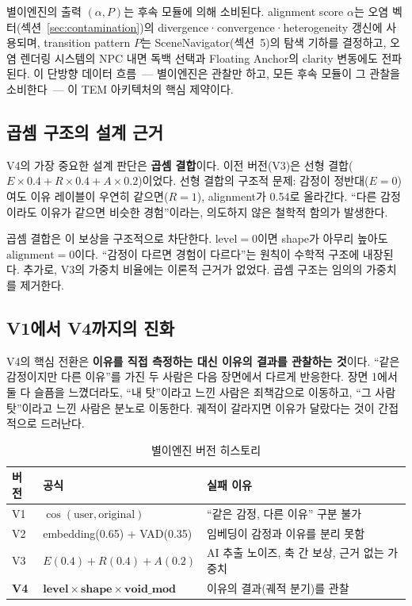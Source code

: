 \documentclass[11pt, a4paper]{article}
\begin{document}
별이엔진의 출력 $(\alpha, P)$는 후속 모듈에 의해 소비된다. alignment score $\alpha$는 오염 벡터(섹션~\ref{sec:contamination})의 divergence·convergence·heterogeneity 갱신에 사용되며, transition pattern $P$는 SceneNavigator(섹션~5)의 탐색 기하를 결정하고, 오염 렌더링 시스템의 NPC 내면 독백 선택과 Floating Anchor의 clarity 변동에도 전파된다. 이 단방향 데이터 흐름~--- 별이엔진은 관찰만 하고, 모든 후속 모듈이 그 관찰을 소비한다~--- 이 TEM 아키텍처의 핵심 제약이다.

\subsection{곱셈 구조의 설계 근거}

V4의 가장 중요한 설계 판단은 \textbf{곱셈 결합}이다. 이전 버전(V3)은 선형 결합($E \times 0.4 + R \times 0.4 + A \times 0.2$)이었다. 선형 결합의 구조적 문제: 감정이 정반대($E=0$)여도 이유 레이블이 우연히 같으면($R=1$), alignment가 0.54로 올라간다. ``다른 감정이라도 이유가 같으면 비슷한 경험''이라는, 의도하지 않은 철학적 함의가 발생한다.

곱셈 결합은 이 보상을 구조적으로 차단한다. $\text{level} = 0$이면 shape가 아무리 높아도 $\text{alignment} = 0$이다. ``감정이 다르면 경험이 다르다''는 원칙이 수학적 구조에 내장된다. 추가로, V3의 가중치 비율에는 이론적 근거가 없었다. 곱셈 구조는 임의의 가중치를 제거한다.

\subsection{V1에서 V4까지의 진화}

V4의 핵심 전환은 \textbf{이유를 직접 측정하는 대신 이유의 결과를 관찰하는 것}이다. ``같은 감정이지만 다른 이유''를 가진 두 사람은 다음 장면에서 다르게 반응한다. 장면 1에서 둘 다 슬픔을 느꼈더라도, ``내 탓''이라고 느낀 사람은 죄책감으로 이동하고, ``그 사람 탓''이라고 느낀 사람은 분노로 이동한다. 궤적이 갈라지면 이유가 달랐다는 것이 간접적으로 드러난다.

\begin{table}[htbp]
\centering
\small
\begin{tabular}{p{1cm}p{4.5cm}p{7.5cm}}
\toprule
\textbf{버전} & \textbf{공식} & \textbf{실패 이유} \\
\midrule
V1 & $\cos(\text{user}, \text{original})$ & ``같은 감정, 다른 이유'' 구분 불가 \\
V2 & embedding(0.65) + VAD(0.35) & 임베딩이 감정과 이유를 분리 못함 \\
V3 & $E(0.4) + R(0.4) + A(0.2)$ & AI 추출 노이즈, 축 간 보상, 근거 없는 가중치 \\
\textbf{V4} & $\textbf{level} \times \textbf{shape} \times \textbf{void\_mod}$ & 이유의 결과(궤적 분기)를 관찰 \\
\bottomrule
\end{tabular}
\caption{별이엔진 버전 히스토리}
\label{tab:versions}
\end{table}
\end{document}
